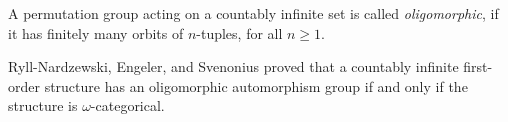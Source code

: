\documentclass[12pt]{article}
\begin{document}
A permutation group acting on a countably
infinite set is called \emph{oligomorphic},
if it has finitely many orbits of $n$-tuples,
for all $n \geq 1$.

Ryll-Nardzewski, Engeler, and Svenonius proved that
a countably infinite first-order structure has an oligomorphic
automorphism group if and only if the structure is
$\omega$-categorical.
\end{document}
